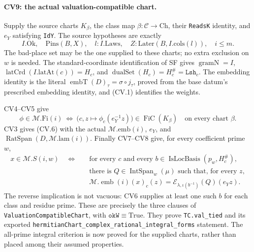 \paragraph{CV9: the actual valuation-compatible chart.}
Supply the source charts \(K_\beta\), the class map
\(\beta:\mathcal C\to\mathrm{Ch}\), their \texttt{ReadsK}
identity, and \(e_Y\) satisfying \texttt{IdY}.
The source hypotheses are exactly
\[
 I.\mathrm{Ok},\quad\mathrm{Pins}(B,X),\quad
 l:I.\mathrm{Laws},\quad
 Z:\mathrm{Later}(B,I.\mathrm{cols}(l)),\quad i\le m.
                                                               \tag{CV.20}
\]
The bad-place set may be the one supplied to these
charts; no extra exclusion on \(w\) is needed.
The standard-coordinate identification of SF gives
\(\operatorname{gramN}=I\),
\(\operatorname{latCrd}(I.\mathrm{latAt}(c))=H_c\),
and \(\operatorname{dualSet}(H_c)=H_c^\#=\texttt{Lsh}_c\).
The embedding identity is the literal
\(\operatorname{embT}(D)_\tau=\sigma\circ j_\tau\),
proved from the base datum's prescribed embedding
identity, and (CV.1) identifies the weights.

CV4--CV5 give
\[
 \phi\in\mathcal M.\mathrm{Fi}(i)
 \ \Longleftrightarrow\
 \bigl(c,z\mapsto\phi_c(e_Y^{-1}z)\bigr)
       \in\operatorname{FiC}(K_\beta)
                   \quad\text{on every chart }\beta.         \tag{CV.21}
\]
CV3 gives (CV.6) with the actual
\(\mathcal M.\mathrm{emb}(i)\), \(e_Y\), and
\(\operatorname{RatSpan}(D,\mathcal M.\mathrm{lam}(i))\).
Finally CV7--CV8 give, for every coefficient prime \(w\),
\[
 \begin{split}
 x\in\mathcal M.S(i,w)
 \quad\Longleftrightarrow\quad
 &\text{for every }c\text{ and every }
    b\in\operatorname{IsLocBasis}(p_w,H_c^\#),\\
 &\text{there is }Q\in\operatorname{IntSpan}_w(\mu)
    \text{ such that, for every }z,\\[-2pt]
 &\mathcal M.\operatorname{emb}(i)(x)_c(z)
       =\mathcal E_{\lambda,\iota(b^{-1})}(Q)(e_Yz).
 \end{split}                                                   \tag{CV.22}
\]
The reverse implication is not vacuous: CV6 supplies at
least one such \(b\) for each class and residue prime.
These are precisely the three clauses of
\texttt{ValuationCompatibleChart}, with
\(\texttt{okW}\equiv\mathrm{True}\).
They prove \texttt{TC.val\_tied} and its exported
\texttt{hermitianChart\_complex\_rational\_integral\_forms}
statement. The all-prime integral criterion is now proved
for the supplied charts, rather than placed among their
assumed properties.

